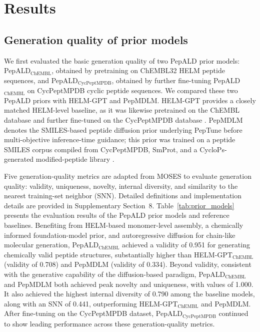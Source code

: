 \section{Results}\label{sec:results}

\subsection{Generation quality of prior models}\label{subsec:prior_generation_quality}

We first evaluated the basic generation quality of two PepALD prior models: PepALD$_{\mathrm{ChEMBL}}$, obtained by pretraining on ChEMBL32 HELM peptide sequences, and PepALD$_{\mathrm{CycPeptMPDB}}$, obtained by further fine-tuning PepALD$_{\mathrm{ChEMBL}}$ on CycPeptMPDB cyclic peptide sequences.
We compared these two PepALD priors with HELM-GPT and PepMDLM.
HELM-GPT provides a closely matched HELM-level baseline, as it was likewise pretrained on the ChEMBL database and further fine-tuned on the CycPeptMPDB database \citep{ref_helm_gpt}.
PepMDLM denotes the SMILES-based peptide diffusion prior underlying PepTune before multi-objective inference-time guidance; this prior was trained on a peptide SMILES corpus compiled from CycPeptMPDB, SmProt, and a CycloPs-generated modified-peptide library \citep{ref_peptune}.

Five generation-quality metrics are adapted from MOSES \citep{ref_moses} to evaluate generation quality: validity, uniqueness, novelty, internal diversity, and similarity to the nearest training-set neighbor (SNN). Detailed definitions and implementation details are provided in Supplementary Section~8. Table~\ref{tab:prior_models} presents the evaluation results of the PepALD prior models and reference baselines.
Benefiting from HELM-based monomer-level assembly, a chemically informed foundation-model prior, and autoregressive diffusion for chain-like molecular generation, PepALD$_{\mathrm{ChEMBL}}$ achieved a validity of 0.951 for generating chemically valid peptide structures, substantially higher than HELM-GPT$_{\mathrm{ChEMBL}}$ (validity of 0.708) and PepMDLM (validity of 0.334).
Beyond validity, consistent with the generative capability of the diffusion-based paradigm, PepALD$_{\mathrm{ChEMBL}}$ and PepMDLM both achieved peak novelty and uniqueness, with values of 1.000.
It also achieved the highest internal diversity of 0.790 among the baseline models, along with an SNN of 0.441, outperforming HELM-GPT$_{\mathrm{ChEMBL}}$ and PepMDLM.
After fine-tuning on the CycPeptMPDB dataset, PepALD$_{\mathrm{CycPeptMPDB}}$ continued to show leading performance across these generation-quality metrics.

